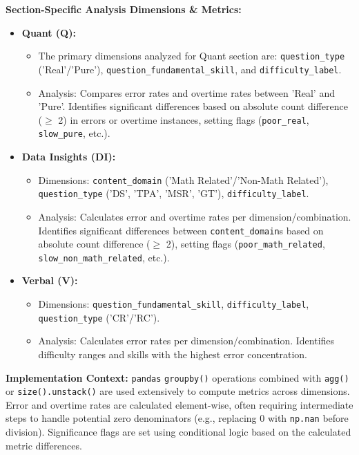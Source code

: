 \documentclass{article}
\begin{document}
\newpage
\textbf{Section-Specific Analysis Dimensions \& Metrics:}
\begin{itemize}
    \item \textbf{Quant (Q):}
    \begin{itemize}
        \item The primary dimensions analyzed for Quant section are: \texttt{question\_type} ('Real'/'Pure'), \texttt{question\_fundamental\_skill}, and \texttt{difficulty\_label}.
        \item Analysis: Compares error rates and overtime rates between 'Real' and 'Pure'. Identifies significant differences based on absolute count difference ($\geq$ 2) in errors or overtime instances, setting flags (\texttt{poor\_real}, \texttt{slow\_pure}, etc.).
    \end{itemize}
    \item \textbf{Data Insights (DI):}
    \begin{itemize}
        \item Dimensions: \texttt{content\_domain} ('Math Related'/'Non-Math Related'), \texttt{question\_type} ('DS', 'TPA', 'MSR', 'GT'), \texttt{difficulty\_label}.
        \item Analysis: Calculates error and overtime rates per dimension/combination. Identifies significant differences between \texttt{content\_domain}s based on absolute count difference ($\geq$ 2), setting flags (\texttt{poor\_math\_related}, \texttt{slow\_non\_math\_related}, etc.).
    \end{itemize}
    \item \textbf{Verbal (V):}
    \begin{itemize}
        \item Dimensions: \texttt{question\_fundamental\_skill}, \texttt{difficulty\_label}, \texttt{question\_type} ('CR'/'RC').
        \item Analysis: Calculates error rates per dimension/combination. Identifies difficulty ranges and skills with the highest error concentration.
    \end{itemize}
\end{itemize}

\textbf{Implementation Context:} \texttt{pandas} \texttt{groupby()} operations combined with \texttt{agg()} or \texttt{size().unstack()} are used extensively to compute metrics across dimensions. Error and overtime rates are calculated element-wise, often requiring intermediate steps to handle potential zero denominators (e.g., replacing 0 with \texttt{np.nan} before division). Significance flags are set using conditional logic based on the calculated metric differences.
\end{document}
